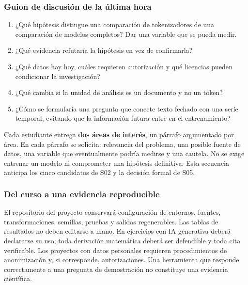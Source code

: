\subsubsection*{Guion de discusión de la última hora}

\begin{enumerate}
\item ¿Qué hipótesis distingue una comparación de tokenizadores de una
 comparación de modelos completos? Dar una variable que se pueda medir.
\item ¿Qué evidencia refutaría la hipótesis en vez de confirmarla?
\item ¿Qué datos hay hoy, cuáles requieren autorización y qué licencias
 pueden condicionar la investigación?
\item ¿Qué cambia si la unidad de análisis es un documento y no un token?
\item ¿Cómo se formularía una pregunta que conecte texto fechado con una
 serie temporal, evitando que la información futura entre en el entrenamiento?
\end{enumerate}
\begin{investigacion}
Cada estudiante entrega \textbf{dos áreas de interés}, un párrafo argumentado
por área. En cada párrafo se solicita: relevancia del problema, una posible
fuente de datos, una variable que eventualmente podría medirse y una cautela.
No se exige entrenar un modelo ni comprometer una hipótesis definitiva.
Esta secuencia anticipa los cinco candidatos de S02 y la decisión formal de S05.
\end{investigacion}

\subsubsection*{Del curso a una evidencia reproducible}

El repositorio del proyecto conservará configuración de entornos, fuentes,
transformaciones, semillas, pruebas y salidas regenerables. Las tablas de resultados
no deben editarse a mano. En ejercicios con IA generativa deberá declararse su
uso; toda derivación matemática deberá ser defendible y toda cita verificable.
Los proyectos con datos personales requieren procedimientos de anonimización y,
si corresponde, autorizaciones. Una herramienta que responde correctamente a una
pregunta de demostración no constituye una evidencia científica.





